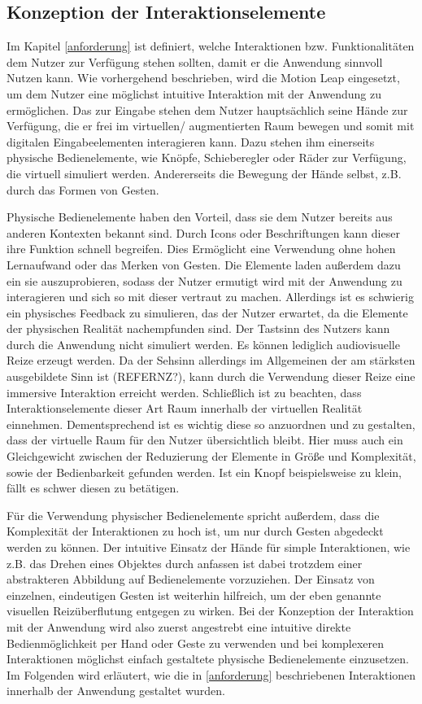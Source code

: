 \subsection{Konzeption der Interaktionselemente}

Im Kapitel \ref{anforderung} ist definiert, welche Interaktionen bzw. Funktionalitäten dem Nutzer zur Verfügung stehen sollten, damit er die Anwendung sinnvoll Nutzen kann. 
Wie vorhergehend beschrieben, wird die Motion Leap eingesetzt, um dem Nutzer eine möglichst intuitive Interaktion mit der Anwendung zu ermöglichen. Das zur Eingabe stehen dem Nutzer hauptsächlich seine Hände zur Verfügung, die er frei im virtuellen/ augmentierten Raum bewegen und somit mit digitalen Eingabeelementen interagieren kann. 
Dazu stehen ihm einerseits physische Bedienelemente, wie Knöpfe, Schieberegler oder Räder zur Verfügung, die virtuell simuliert werden. Andererseits die Bewegung der Hände selbst, z.B. durch das Formen von Gesten.

Physische Bedienelemente haben den Vorteil, dass sie dem Nutzer bereits aus anderen Kontexten bekannt sind. Durch Icons oder Beschriftungen kann dieser ihre Funktion schnell begreifen. Dies Ermöglicht eine Verwendung ohne hohen Lernaufwand oder das Merken von Gesten. 
Die Elemente laden außerdem dazu ein sie auszuprobieren, sodass der Nutzer ermutigt wird mit der Anwendung zu interagieren und sich so mit dieser vertraut zu machen. 
Allerdings ist es schwierig ein physisches Feedback zu simulieren, das der Nutzer erwartet, da die Elemente der physischen Realität nachempfunden sind. Der Tastsinn des Nutzers kann durch die Anwendung nicht simuliert werden. Es können lediglich audiovisuelle Reize erzeugt werden. Da der Sehsinn allerdings im Allgemeinen der am stärksten ausgebildete Sinn ist (REFERNZ?), kann durch die Verwendung dieser Reize eine immersive Interaktion erreicht werden. 
Schließlich ist zu beachten, dass Interaktionselemente dieser Art Raum innerhalb der virtuellen Realität einnehmen. Dementsprechend ist es wichtig diese so anzuordnen und zu gestalten, dass der virtuelle Raum für den Nutzer übersichtlich bleibt. Hier muss auch ein Gleichgewicht zwischen der Reduzierung der Elemente in Größe und Komplexität, sowie der Bedienbarkeit gefunden werden. Ist ein Knopf beispielsweise zu klein, fällt es schwer diesen zu betätigen. 

Für die Verwendung physischer Bedienelemente spricht außerdem, dass die Komplexität der Interaktionen zu hoch ist, um nur durch Gesten abgedeckt werden zu können. Der intuitive Einsatz der Hände für simple Interaktionen, wie z.B. das Drehen eines Objektes durch anfassen ist dabei trotzdem einer abstrakteren Abbildung auf Bedienelemente vorzuziehen. Der Einsatz von einzelnen, eindeutigen Gesten ist weiterhin hilfreich, um der eben genannte visuellen Reizüberflutung entgegen zu wirken. 
Bei der Konzeption der Interaktion mit der Anwendung wird also zuerst angestrebt eine intuitive direkte Bedienmöglichkeit per Hand oder Geste zu verwenden und bei komplexeren Interaktionen möglichst einfach gestaltete physische Bedienelemente einzusetzen.
Im Folgenden wird erläutert, wie die in \ref{anforderung} beschriebenen Interaktionen innerhalb der Anwendung gestaltet wurden.

